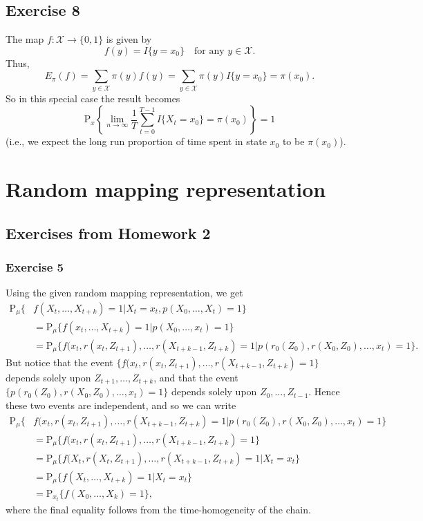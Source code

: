 \documentclass[12pt]{article}
\newcommand{\Prob}{\mathrm{P}}
\begin{document}
\subsection*{Exercise 8}

The map $f : \mathcal{X} \to \{0, 1\}$ is given by
\begin{equation*}
f(y) = I\{y = x_0\} \quad \text{for any $y \in \mathcal{X}$}.
\end{equation*}
Thus,
\begin{equation*}
E_\pi(f) = \sum_{y \in \mathcal{X}} \pi(y) f(y) = \sum_{y \in \mathcal{X}} \pi(y) I\{y = x_0\} = \pi(x_0).
\end{equation*}
So in this special case the result becomes
\begin{equation*}
\Prob_x\left\{\lim_{n \to \infty} \frac{1}{T} \sum_{t=0}^{T-1} I\{X_t = x_0\} = \pi(x_0) \right\} = 1
\end{equation*}
(i.e., we expect the long run proportion of time spent in state $x_0$ to be $\pi(x_0)$).

\section*{Random mapping representation}

\subsection*{Exercises from Homework 2}

\subsubsection*{Exercise 5}

Using the given random mapping representation, we get
\begin{align*}
\Prob_\mu\{&f(X_t, \ldots, X_{t+k}) = 1 | X_t = x_t, p(X_0, \ldots, X_t) = 1\} \\
&= \Prob_\mu\{f(x_t, \ldots, X_{t+k}) = 1 | p(X_0, \ldots, x_t) = 1\} \\
&= \Prob_\mu\{f(x_t, r(x_t, Z_{t+1}), \ldots, r(X_{t+k-1}, Z_{t+k}) = 1 | p(r_0(Z_0), r(X_0, Z_0), \ldots, x_t) = 1\}.
\end{align*}
But notice that the event $\{f(x_t, r(x_t, Z_{t+1}), \ldots, r(X_{t+k-1}, Z_{t+k}) = 1\}$ depends solely upon $Z_{t+1}, \ldots, Z_{t+k}$, and that the event $\{p(r_0(Z_0), r(X_0, Z_0), \ldots, x_t) = 1\}$ depends solely upon $Z_0, \ldots, Z_{t-1}$. Hence these two events are independent, and so we can write
\begin{align*}
\Prob_\mu\{&f(x_t, r(x_t, Z_{t+1}), \ldots, r(X_{t+k-1}, Z_{t+k}) = 1 | p(r_0(Z_0), r(X_0, Z_0), \ldots, x_t) = 1\} \\
&= \Prob_\mu\{f(x_t, r(x_t, Z_{t+1}), \ldots, r(X_{t+k-1}, Z_{t+k}) = 1\} \\
&= \Prob_\mu\{f(X_t, r(X_t, Z_{t+1}), \ldots, r(X_{t+k-1}, Z_{t+k}) = 1 | X_t = x_t\} \\
&= \Prob_\mu\{f(X_t, \ldots, X_{t+k}) = 1 | X_t = x_t\} \\
&= \Prob_{x_t}\{f(X_0, \ldots, X_k) = 1\},
\end{align*}
where the final equality follows from the time-homogeneity of the chain.
\end{document}
